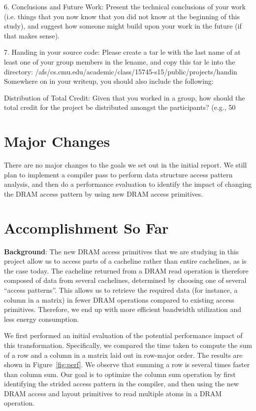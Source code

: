 \documentclass[letterpaper]{article}
\begin{document}
6.
Conclusions and Future Work:
Present the technical conclusions of your work (i.e. things
that you now know that you did not know at the beginning of this study), and suggest how
someone might build upon your work in the future (if that makes sense).

7.
Handing in your source code:
Please create a tar le with the last name of at least one
of your group members in the lename, and copy this tar le into the directory:
/afs/cs.cmu.edu/academic/class/15745-s15/public/projects/handin
Somewhere on in your writeup, you should also include the following:

Distribution of Total Credit:
Given that you worked in a group, how should the total credit
for the project be distributed amongst the participants?  (e.g., 50%

\section{Major Changes}

There are no major changes to the goals we set out in the initial report.
We still plan to implement a compiler pass to perform data structure access pattern analysis, and
then do a performance evaluation to identify the impact of changing the DRAM
access pattern by using new DRAM access primitives.

\section{Accomplishment So Far}

\textbf{Background}: The new DRAM access primitives that we are studying in
this project allow us to access parts of a cacheline rather than entire cachelines,
as is the case today. The cacheline returned from a DRAM read operation is
therefore composed of data from several cachelines, determined by choosing one
of several ``access patterns''.
This allows us to retrieve the required data (for instance, a column in a matrix) in fewer DRAM operations
compared to existing access primitives. Therefore, we end up with more efficient bandwidth
utilization and less energy consumption.

We first performed an initial evaluation of the potential performance impact of this transformation.
Specifically, we compared the time taken to compute the sum of a row and a column in a matrix laid out in
row-major order. The results are shown in Figure~\ref{fig:perf}. We observe that summing a row is several times faster than column sum.
Our goal is to optimize the column sum operation by first identifying the
strided access pattern in the compiler, and then using the new DRAM access and
layout primitives to read multiple atoms in a DRAM operation.
\end{document}

